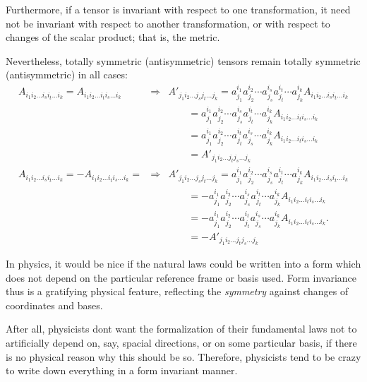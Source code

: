 Furthermore, if a tensor is invariant with respect to one transformation, it need not
be invariant with respect to another transformation, or with respect to
changes of the scalar product; that is, the metric.

Nevertheless, totally symmetric (antisymmetric) tensors remain totally
symmetric (antisymmetric) in all cases:
\begin{eqnarray}
A_{i_1i_2 \ldots i_si_t\ldots i_k}
=
A_{i_1i_2 \ldots i_ti_s\ldots i_k}
&\Longrightarrow&
A'_{j_1i_2 \ldots j_s j_t\ldots j_k}
=
a_{j_1}^{i_1}a_{j_2}^{i_2}\cdots
a_{j_s}^{i_s}a_{j_t}^{i_t}\cdots
a_{j_k}^{i_k} A_{i_1 i_2\ldots i_s i_t\ldots  i_k}
\nonumber \\ &&\qquad
=
a_{j_1}^{i_1}a_{j_2}^{i_2}\cdots
a_{j_s}^{i_s}a_{j_t}^{i_t}\cdots
a_{j_k}^{i_k} A_{i_1 i_2\ldots i_t i_s\ldots  i_k}
\nonumber \\ &&\qquad
=
a_{j_1}^{i_1}a_{j_2}^{i_2}\cdots
a_{j_t}^{i_t}a_{j_s}^{i_s}\cdots
a_{j_k}^{i_k} A_{i_1 i_2\ldots i_t i_s\ldots  i_k}
\nonumber \\ &&\qquad
=
A'_{j_1i_2 \ldots j_t j_s\ldots j_k}
\\
A_{i_1i_2 \ldots i_si_t\ldots i_k}
=
-A_{i_1i_2 \ldots i_ti_s\ldots i_k}
=
&\Longrightarrow&
A'_{j_1i_2 \ldots j_s j_t\ldots j_k}
=
a_{j_1}^{i_1}a_{j_2}^{i_2}\cdots
a_{j_s}^{i_s}a_{j_t}^{i_t}\cdots
a_{j_k}^{i_k} A_{i_1 i_2\ldots i_s i_t\ldots  i_k}
\nonumber \\ &&\qquad
=
-a_{j_1}^{i_1}a_{j_2}^{i_2}\cdots
a_{j_s}^{i_s}a_{j_t}^{i_t}\cdots
a_{j_k}^{i_k} A_{i_1 i_2\ldots i_t i_s\ldots  i_k}
\nonumber \\ &&\qquad
=
-a_{j_1}^{i_1}a_{j_2}^{i_2}\cdots
a_{j_t}^{i_t}a_{j_s}^{i_s}\cdots
a_{j_k}^{i_k} A_{i_1 i_2\ldots i_t i_s\ldots  i_k}.
\nonumber \\ &&\qquad
=
-A'_{j_1i_2 \ldots j_t j_s\ldots j_k}
\end{eqnarray}


In physics, it would be nice if the natural laws could be written into a
form which does not depend on the particular reference frame or  basis
used.
Form invariance thus is a gratifying physical feature, reflecting the
{\em symmetry} against changes of coordinates and bases.

After all, physicists dont want the formalization of their fundamental laws not to artificially depend on,
say, spacial directions, or on some particular basis, if there is no physical reason why this should be so.
Therefore, physicists tend to be crazy to write down everything in a
form invariant manner.

